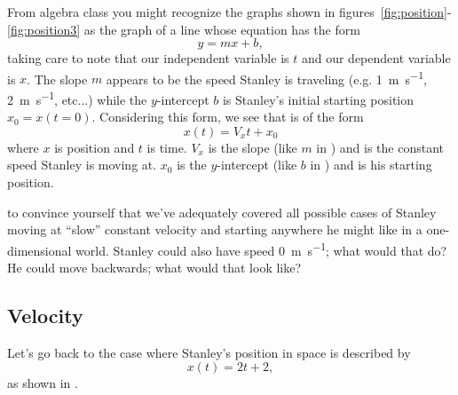 \documentclass{tufte-handout}
\begin{document}
From algebra class you might recognize the graphs shown in figures~\ref{fig:position}-\ref{fig:position3} as the graph of a line whose equation has the form
\begin{equation}
y = mx + b,
\label{eq:algebraline}
\end{equation}
taking care to note that our independent variable is $t$ and our dependent variable is $x$. The slope $m$ appears to be the speed Stanley is traveling (e.g. \SI{1}{\meter\per\second}, \SI{2}{\meter\per\second}, etc...) while the $y$-intercept $b$ is Stanley's initial starting position $x_0 = x(t=0)$. Considering this form, we see that  is of the form
\begin{equation}
x(t) = V_x t + x_0 
\end{equation}
where $x$ is position and $t$ is time. $V_x$ is the slope (like $m$ in ) and is the constant speed Stanley is moving at. $x_0$ is the $y$-intercept (like $b$ in ) and is his starting position. 

 to convince yourself that we've adequately covered all possible cases of Stanley moving at ``slow'' constant velocity and starting anywhere he might like in a one-dimensional world. Stanley could also have speed \SI{0}{\meter\per\second}; what would that do? He could move backwards; what would that look like? 

\subsection{Velocity}
Let's go back to the case where Stanley's position in space is described by 
\begin{equation}
x(t) = 2 t + 2,
\end{equation}
as shown in .
\begin{marginfigure}
\caption{Stanley's position and velocity}
\label{fig:velocity1}
\end{marginfigure}
\end{document}
